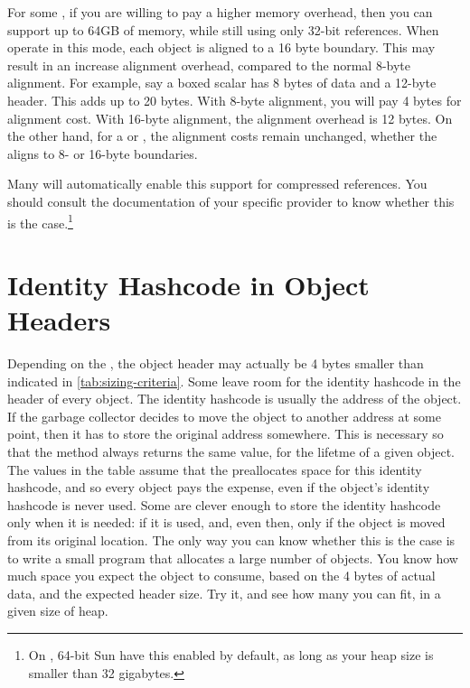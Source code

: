 For some \jres, if you are willing to pay a higher memory overhead, then you can
support up to 64GB of memory, while still using only 32-bit references. When
\jres operate in this mode, each object is aligned to a 16 byte boundary. This
may result in an increase alignment overhead, compared to the normal 8-byte
alignment. For example, say a  boxed scalar has 8 bytes of data
and a 12-byte header. This adds up to 20 bytes. With 8-byte alignment, you will
pay 4 bytes for alignment cost. With 16-byte alignment, the alignment overhead
is 12 bytes. On the other hand, for a  or , the
alignment costs remain unchanged, whether the \jre aligns to 8- or 16-byte
boundaries.

Many \jres will automatically enable this support for compressed references. You
should consult the documentation of your specific \jre provider to know whether
this is the case.\footnote{On \javaseven, 64-bit
Sun \jres have this enabled by default, as long as your heap size is smaller
than 32 gigabytes.}



\section{Identity Hashcode in Object Headers}

Depending on the \jre, the object header may actually be 4 bytes smaller than
indicated in \autoref{tab:sizing-criteria}. Some \jres leave room for the
identity hashcode in the header of every object. The identity hashcode is
usually the address of the object. If the garbage collector decides to move the
object to another address at some point, then it has to store the original
address somewhere. This is necessary so that the  method
always returns the same value, for the lifetme of a given object. The values in
the table assume that the \jre preallocates space for this identity hashcode,
and so every object pays the expense, even if the object's identity hashcode is
never used. Some \jres are clever enough to store the identity hashcode only
when it is needed: if it is used, and, even then, only if the object is moved
from its original location. The only way you can know whether this is the case
is to write a small program that allocates a large number of 
objects. You know how much space you expect the object to consume, based on the
4 bytes of actual data, and the expected header size. Try it, and see how many
you can fit, in a given size of heap.


